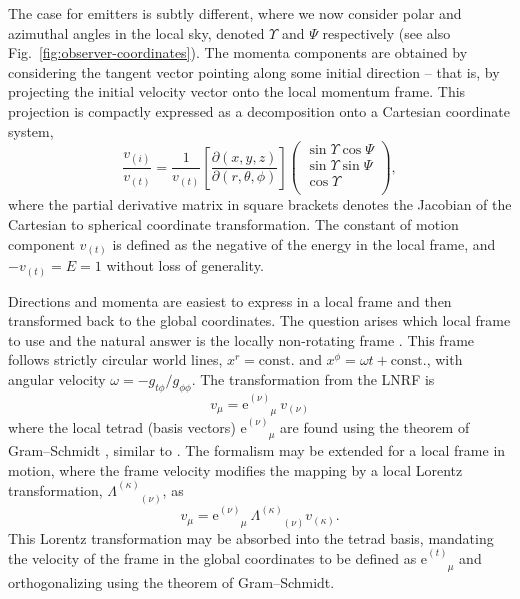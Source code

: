 \documentclass[fleqn,usenatbib]{mnras}
\newcommand{\e}{\text{e}}
\newcommand{\utensor}[3]{#1^{#2}_{\phantom{#2}#3}}
\newcommand{\pderiv}[2]{\frac{\partial #1}{\partial #2}}
\begin{document}
The case for emitters is subtly different, where we now consider polar and
azimuthal angles in the local sky, denoted $\Upsilon$ and $\Psi$ respectively
(see also Fig.~\ref{fig:observer-coordinates}). The momenta components are
obtained by considering the tangent vector pointing along some initial direction
-- that is, by projecting the initial velocity vector onto the local momentum
frame. This projection is compactly expressed as a decomposition onto a
Cartesian coordinate system,
\begin{equation}
    \label{eq:local-angle-to-velocity}
    \frac{v_{(i)}}{v_{(t)}} = \frac{1}{v_{(t)}}
    \left[\pderiv{(x, y, z)}{(r, \theta, \phi)}\right]
    \left(
    \begin{matrix}
        \sin \Upsilon \cos \Psi \\
        \sin \Upsilon \sin \Psi \\
        \cos \Upsilon \\
    \end{matrix}
    \right),
\end{equation}
where the partial derivative matrix in square brackets denotes the Jacobian of
the Cartesian to spherical coordinate transformation. The constant of motion
component $v_{(t)}$ is defined as the negative of the energy in the local frame,
and $-v_{(t)}=E=1$ without loss of generality.

Directions and momenta are easiest to express in a local frame and then
transformed back to the global coordinates. The question arises which local
frame to use and the natural answer is the locally non-rotating frame
\citep[LNRF;][]{bardeen_rotating_1972}. This frame follows strictly circular
world lines, $x^r = \text{const.}$ and $x^\phi = \omega t + \text{const.}$,
with angular velocity $\omega = -g_{t\phi} / g_{\phi\phi}$. The transformation
from the LNRF is
\begin{equation}
    \label{eq:local-to-global-velocity}
    v_\mu = \e^{(\nu)}_{\phantom{(\nu)}\mu}\  v_{(\nu)}
\end{equation}
where the local tetrad (basis vectors) $\e^{(\nu)}_{\phantom{(\nu)}\mu}$ are
found using the theorem of Gram--Schmidt
\citep[][Appendix~\ref{appendix:gram-schmidt}]{schmidt_uber_1989}, similar to
\citet{wilkins_2020_isco}. The formalism
may be extended for a local frame in motion, where the frame velocity modifies
the mapping by a local Lorentz transformation,
$\Lambda^{(\kappa)}_{\phantom{(\kappa)}(\nu)}$, as
\begin{equation}
    v_\mu = \e^{(\nu)}_{\phantom{(\nu)}\mu}\  \Lambda^{(\kappa)}_{\phantom{(a)}(\nu)} v_{(\kappa)}.
\end{equation}
This Lorentz transformation may be absorbed into the tetrad basis, mandating the
velocity of the frame in the global coordinates to be defined as
$\utensor{\e}{(t)}{\mu}$ and orthogonalizing using the theorem of Gram--Schmidt.
\end{document}
